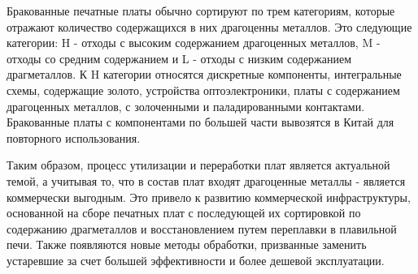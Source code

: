 Бракованные печатные платы обычно сортируют по трем категориям, которые отражают количество содержащихся в них драгоценны металлов. Это следующие категории: H - отходы с высоким содержанием драгоценных металлов, M - отходы со средним содержанием и L - отходы с низким содержанием драгметаллов. К H категории относятся дискретные компоненты, интегральные схемы, содержащие золото, устройства оптоэлектроники, платы с содержанием драгоценных металлов, с золоченными и паладированными контактами. Бракованные платы с компонентами по большей части вывозятся в Китай для повторного использования.

Таким образом, процесс утилизации и переработки плат является актуальной темой, а учитывая то, что в состав плат входят драгоценные металлы - является коммерчески выгодным. Это привело к развитию коммерческой инфраструктуры, основанной на сборе печатных плат с последующей их сортировкой по содержанию драгметаллов и восстановлением путем переплавки в плавильной печи. Также появляются новые методы обработки, призванные заменить устаревшие за счет большей эффективности и более дешевой эксплуатации.